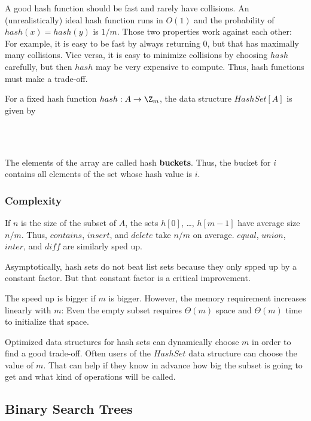 A good hash function should be fast and rarely have collisions.
An (unrealistically) ideal hash function runs in $O(1)$ and the probability of $hash(x)=hash(y)$ is $1/m$.
Those two properties work against each other: For example, it is easy to be fast by always returning $0$, but that has maximally many collisions.
Vice versa, it is easy to minimize collisions by choosing $hash$ carefully, but then $hash$ may be very expensive to compute.
Thus, hash functions must make a trade-off.

For a fixed hash function $hash:A\to \Z_m$, the data structure $HashSet[A]$ is given by
\begin{acode}
\\
\\
\end{acode}
The elements of the array are called hash \textbf{buckets}.
Thus, the bucket for $i$ contains all elements of the set whose hash value is $i$.

\subsubsection{Complexity}
If $n$ is the size of the subset of $A$, the sets $h[0]$, \ldots, $h[m-1]$ have average size $n/m$.
Thus, $contains$, $insert$, and $delete$ take $n/m$ on average.
$equal$, $union$, $inter$, and $diff$ are similarly sped up.
\medskip

Asymptotically, hash sets do not beat list sets because they only spped up by a constant factor.
But that constant factor is a critical improvement.

The speed up is bigger if $m$ is bigger.
However, the memory requirement increases linearly with $m$: Even the empty subset requires $\Theta(m)$ space and $\Theta(m)$ time to initialize that space.

Optimized data structures for hash sets can dynamically choose $m$ in order to find a good trade-off.
Often users of the $HashSet$ data structure can choose the value of $m$.
That can help if they know in advance how big the subset is going to get and what kind of operations will be called.

\subsection{Binary Search Trees}\label{sec:ad:bst}

